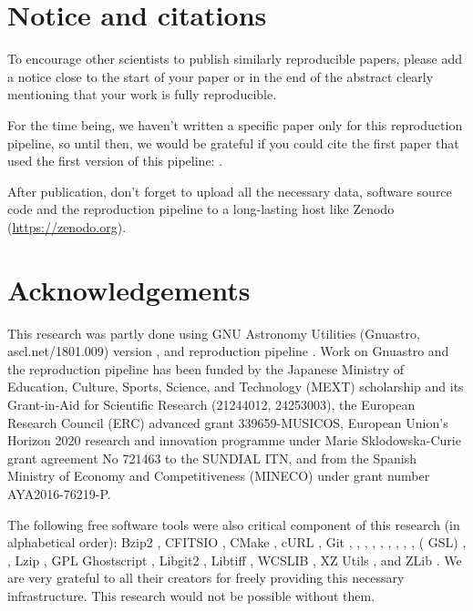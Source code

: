 \documentclass[10pt, twocolumn]{article}
\begin{document}
\section{Notice and citations}
To encourage other scientists to publish similarly reproducible papers,
please add a notice close to the start of your paper or in the end of the
abstract clearly mentioning that your work is fully reproducible.

For the time being, we haven't written a specific paper only for this
reproduction pipeline, so until then, we would be grateful if you could
cite the first paper that used the first version of this pipeline:
\citet{ai15}.

After publication, don't forget to upload all the necessary data, software
source code and the reproduction pipeline to a long-lasting host like
Zenodo (\url{https://zenodo.org}).





\section{Acknowledgements}

This research was partly done using GNU Astronomy Utilities (Gnuastro,
ascl.net/1801.009) version \gnuastroversion, and reproduction pipeline
\pipelineversion. Work on Gnuastro and the reproduction pipeline has been
funded by the Japanese Ministry of Education, Culture, Sports, Science, and
Technology (MEXT) scholarship and its Grant-in-Aid for Scientific Research
(21244012, 24253003), the European Research Council (ERC) advanced grant
339659-MUSICOS, European Union’s Horizon 2020 research and innovation
programme under Marie Sklodowska-Curie grant agreement No 721463 to the
SUNDIAL ITN, and from the Spanish Ministry of Economy and Competitiveness
(MINECO) under grant number AYA2016-76219-P.

The following free software tools were also critical component of this
research (in alphabetical order): Bzip2 \bziptwoversion, {\small CFITSIO}
\cfitsioversion, CMake \cmakeversion, c{\small URL} \curlversion, Git
\gitversion,  \bashversion,  \binutilsversion,
 \coreutilsversion,  \gawkversion,
 \grepversion,  \libtoolversion, 
\makeversion,  \sedversion,  ({\small
  GSL}) \gslversion,  \tarversion, Lzip \lzipversion, {\small GPL}
Ghostscript \ghostscriptversion, Libgit2 \libgitwoversion, Libtiff
\libtiffversion, {{\small WCSLIB}} \wcslibversion, {\small XZ} Utils
\xzversion, and ZLib \zlibversion. We are very grateful to all their
creators for freely providing this necessary infrastructure. This research
would not be possible without them.

\printbibliography

\end{document}
